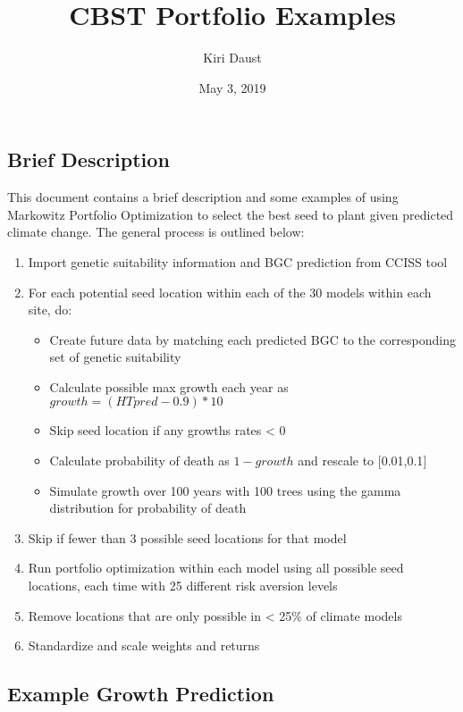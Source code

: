\documentclass[]{article}
\title{CBST Portfolio Examples}
\author{Kiri Daust}
\date{May 3, 2019}
\providecommand{\tightlist}{%
  \setlength{\itemsep}{0pt}\setlength{\parskip}{0pt}}
\begin{document}
\maketitle

\subsection{Brief Description}\label{brief-description}

This document contains a brief description and some examples of using
Markowitz Portfolio Optimization to select the best seed to plant given
predicted climate change. The general process is outlined below:

\begin{enumerate}
\def\labelenumi{\arabic{enumi}.}
\tightlist
\item
  Import genetic suitability information and BGC prediction from CCISS
  tool
\item
  For each potential seed location within each of the 30 models within
  each site, do:

  \begin{itemize}
  \tightlist
  \item
    Create future data by matching each predicted BGC to the
    corresponding set of genetic suitability
  \item
    Calculate possible max growth each year as
    \(growth = (HTpred - 0.9)*10\)
  \item
    Skip seed location if any growths rates \textless{} 0
  \item
    Calculate probability of death as \(1 - growth\) and rescale to
    {[}0.01,0.1{]}
  \item
    Simulate growth over 100 years with 100 trees using the gamma
    distribution for probability of death
  \end{itemize}
\item
  Skip if fewer than 3 possible seed locations for that model
\item
  Run portfolio optimization within each model using all possible seed
  locations, each time with 25 different risk aversion levels
\item
  Remove locations that are only possible in \textless{} 25\% of climate
  models
\item
  Standardize and scale weights and returns
\end{enumerate}

\subsection{Example Growth Prediction}\label{example-growth-prediction}
\end{document}
